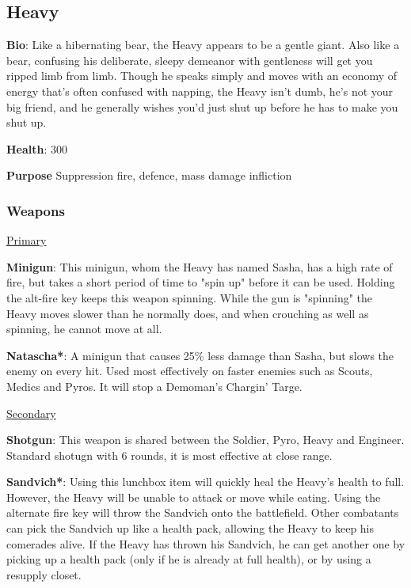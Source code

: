 \subsection{Heavy}
\label{Heavy}
{\bf Bio}:
Like a hibernating bear, the Heavy appears to be a gentle giant. Also like a bear, confusing his deliberate, sleepy demeanor with gentleness will get you ripped limb from limb. Though he speaks simply and moves with an economy of energy that's often confused with napping, the Heavy isn't dumb, he's not your big friend, and he generally wishes you'd just shut up before he has to make you shut up.

{\bf Health}: 300

{\bf Purpose}
Suppression fire, defence, mass damage infliction

\subsubsection {Weapons}


\begin {center}
\underline {Primary}
\end {center}

{\bf Minigun}: This minigun, whom the Heavy has named Sasha, has a high rate of fire, but takes a short period of time to "spin up" before it can be used. Holding the alt-fire key keeps this weapon spinning. While the gun is "spinning" the Heavy moves slower than he normally does, and when crouching as well as spinning, he cannot move at all.

{\bf Natascha*}: A minigun that causes 25\% less damage than Sasha, but slows the enemy on every hit. Used most effectively on faster enemies such as Scouts, Medics and Pyros. It will stop a Demoman's Chargin' Targe.


\begin {center}
\underline {Secondary}
\end {center}

{\bf Shotgun}: This weapon is shared between the Soldier, Pyro, Heavy and Engineer. Standard shotugn with 6 rounds, it is most effective at close range.

{\bf Sandvich*}: Using this lunchbox item will quickly heal the Heavy's health to full.  However, the Heavy will be unable to attack or move while eating. Using the alternate fire key will throw the Sandvich onto the battlefield. Other combatants can pick the Sandvich up like a health pack, allowing the Heavy to keep his comerades alive. If the Heavy has thrown his Sandvich, he can get another one by picking up a health pack (only if he is already at full health), or by using a resupply closet.

